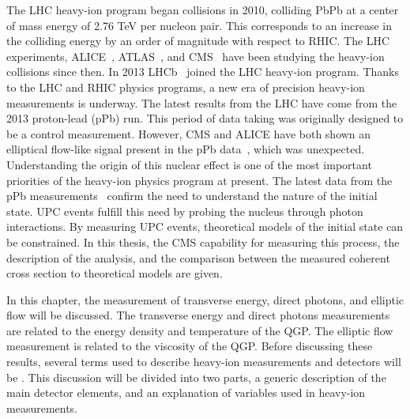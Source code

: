   The LHC heavy-ion program began collisions in 2010, colliding PbPb at 
    a center of mass energy of 2.76 TeV per nucleon pair. 
  This corresponds to an increase in the colliding energy by an order of 
    magnitude with respect to RHIC. 
  The LHC experiments, ALICE~\cite{Aamodt:2008zz}, ATLAS~\cite{Aad:2008zzm}, and CMS~\cite{tCmsE} have been studying the heavy-ion 
    collisions since then. 
  In 2013 LHCb~\cite{Alves:2008zz} joined the LHC heavy-ion program. 
  Thanks to the LHC and RHIC physics programs, a new era of precision
    heavy-ion measurements is underway. 
  The latest results from the LHC have come from the 2013 proton-lead (pPb)
    run.
  This period of data taking was originally designed to be a control 
    measurement.
  However, CMS and ALICE have both shown an elliptical flow-like signal present
    in the pPb data~\cite{Chatrchyan:2013nka,Abelev:2012ola}, which was unexpected.
  Understanding the origin of this nuclear effect is one of the most important
    priorities of the heavy-ion physics program at present. 
  The latest data from the pPb measurements~\cite{Roland:2014jsa} confirm the need to 
    understand the nature of the initial state. 
  UPC events fulfill this need by probing the nucleus through photon 
    interactions.
  By measuring UPC \JPsi{} events, theoretical models of the initial state can 
    be constrained.
  In \DIFaddbegin {}\DIFaddend this thesis, the CMS capability for measuring this process, the 
    description of the analysis, and the comparison between the measured 
    coherent \JPsi{} cross section to theoretical models are given.
  \DIFaddbegin {}\JPsi{}\DIFaddend 

  In this chapter, the measurement of transverse energy, direct photons, and
    elliptic flow will be discussed.
  The transverse energy and direct photons measurements are related to 
    the energy density and temperature of the QGP\DIFdelbegin {}\DIFdelend .
  The elliptic flow measurement is related to the viscosity of the QGP\DIFdelbegin {}\DIFdelend .
  Before discussing these results, several terms used to describe heavy-ion
    measurements and detectors will be \DIFdelbegin {}\DIFdelend \DIFaddbegin {}\DIFaddend . 
  This discussion will be divided into two parts, a generic description of 
    the main detector elements, and an explanation of variables used in
    heavy-ion measurements.

